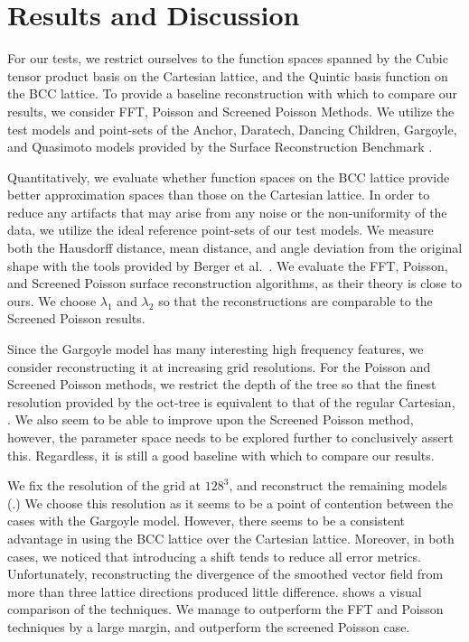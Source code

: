 \section{Results and Discussion}
For our tests, we restrict ourselves to the function spaces spanned by the Cubic tensor product basis on the Cartesian lattice, and the Quintic basis function on the BCC lattice. To provide a baseline reconstruction with which to compare our results, we consider FFT, Poisson and Screened Poisson Methods. We utilize the test models and point-sets of the Anchor, Daratech, Dancing Children, Gargoyle, and Quasimoto models provided by the Surface Reconstruction Benchmark \cite{reconbench}.

Quantitatively, we evaluate whether function spaces on the BCC lattice provide better approximation spaces than those on the Cartesian lattice. In order to reduce any artifacts that may arise from any noise or the non-uniformity of the data, we utilize the ideal reference point-sets of our test models.  We measure both the Hausdorff distance, mean distance, and angle deviation from the original shape with the tools provided by Berger et al.~\cite{reconbench}. We evaluate the FFT, Poisson, and Screened Poisson surface reconstruction algorithms, as their theory is close to ours. We choose $\lambda_1$ and $\lambda_2$ so that the reconstructions are comparable to the Screened Poisson results.

Since the Gargoyle model has many interesting high frequency features, we consider reconstructing it at increasing grid resolutions. For the Poisson and Screened Poisson methods, we restrict the depth of the tree so that the finest resolution provided by the oct-tree is equivalent to that of the regular Cartesian, . We also seem to be able to improve upon the Screened Poisson method, however, the parameter space needs to be explored further to conclusively assert this. Regardless, it is still a good baseline with which to compare our results. 

We fix the resolution of the grid at $128^3$, and reconstruct the remaining models (.) We choose this resolution as it seems to be a point of contention between the cases with the Gargoyle model. However, there seems to be a consistent advantage in using the BCC lattice over the Cartesian lattice. Moreover, in both cases, we noticed that introducing a shift tends to reduce all error metrics. Unfortunately, reconstructing the divergence of the smoothed vector field from more than three lattice directions produced little difference.  shows a visual comparison of the techniques. We manage to outperform the FFT and Poisson techniques by a large margin, and outperform the screened Poisson case.

